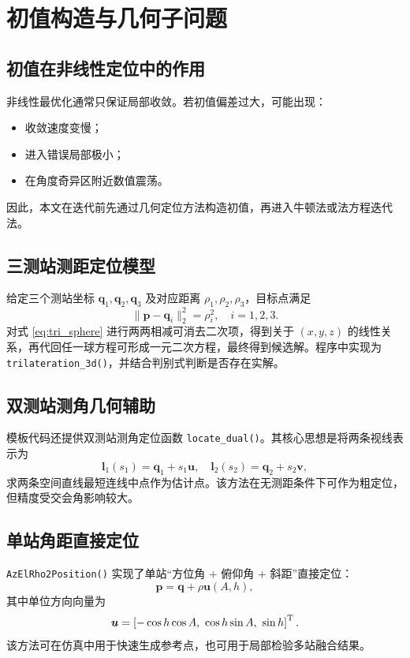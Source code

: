 \chapter{初值构造与几何子问题}

\section{初值在非线性定位中的作用}
非线性最优化通常只保证局部收敛。若初值偏差过大，可能出现：
\begin{itemize}
  \item 收敛速度变慢；
  \item 进入错误局部极小；
  \item 在角度奇异区附近数值震荡。
\end{itemize}
因此，本文在迭代前先通过几何定位方法构造初值，再进入牛顿法或法方程迭代法。

\section{三测站测距定位模型}
给定三个测站坐标 $\bm q_1,\bm q_2,\bm q_3$ 及对应距离 $\rho_1,\rho_2,\rho_3$，目标点满足
\begin{equation}
\|\bm p-\bm q_i\|_2^2=\rho_i^2,\quad i=1,2,3.
\label{eq:tri_sphere}
\end{equation}
对式 \eqref{eq:tri_sphere} 进行两两相减可消去二次项，得到关于 $(x,y,z)$ 的线性关系，再代回任一球方程可形成一元二次方程，最终得到候选解。程序中实现为 \texttt{trilateration\_3d()}，并结合判别式判断是否存在实解。

\section{双测站测角几何辅助}
模板代码还提供双测站测角定位函数 \texttt{locate\_dual()}。其核心思想是将两条视线表示为
\[
\bm l_1(s_1)=\bm q_1+s_1\bm u,\quad
\bm l_2(s_2)=\bm q_2+s_2\bm v,
\]
求两条空间直线最短连线中点作为估计点。该方法在无测距条件下可作为粗定位，但精度受交会角影响较大。

\section{单站角距直接定位}
\texttt{AzElRho2Position()} 实现了单站“方位角 + 俯仰角 + 斜距”直接定位：
\[
\bm p=\bm q+\rho\bm u(A,h),
\]
其中单位方向向量为
\[
\bm u=
\left[
-\cos h\cos A,\ \cos h\sin A,\ \sin h
\right]^{\mathrm{T}}.
\]
该方法可在仿真中用于快速生成参考点，也可用于局部检验多站融合结果。

